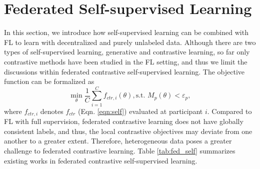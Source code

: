 \documentclass[11pt]{article}
\begin{document}
\section{Federated Self-supervised Learning}\label{sec:fed-self}
In this section, we introduce how self-supervised learning can be combined with FL to learn with decentralized and purely unlabeled data. Although there are two types of self-supervised learning, generative and contrastive learning, so far only contrastive methods have been studied in the FL setting, and thus we limit the discussions within federated contrastive self-supervised learning. The objective function can be formalized as
\begin{equation}
    \min_\theta \frac{1}{C}\sum_{i=1}^Cf_{ctr, i}(\theta), \text{s.t. }M_p(\theta)< \varepsilon_p,
\end{equation}
where $f_{ctr, i}$ denotes $f_{ctr}$ (Eqn. \ref{eqn:self}) evaluated at participant $i$. Compared to FL with full supervision, federated contrastive learning does not have globally consistent labels, and thus, the local contrastive objectives may deviate from one another to a greater extent. Therefore, heterogeneous data poses a greater challenge to federated contrastive learning. Table \ref{tab:fed_self} summarizes existing works in federated contrastive self-supervised learning.
\begin{table}[t]
    \centering
    \caption{Summary of techniques for federated self-supervised learning. $\times$ indicates that the proposed method does not focus on this issue. }
    \label{tab:fed_self}
\end{table}
\end{document}
